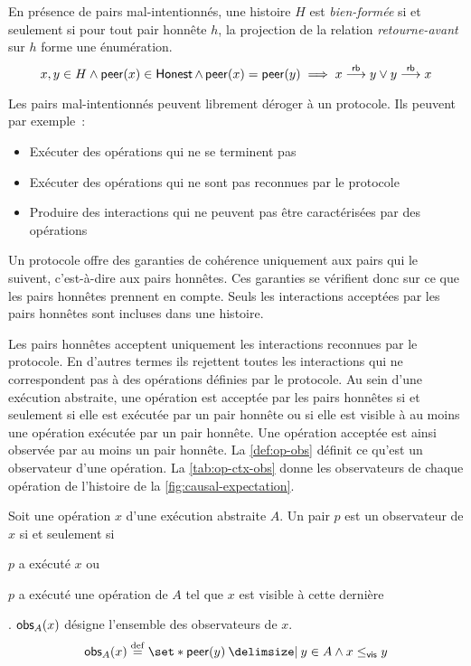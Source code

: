 \begin{definition}\label{def:wf-history-malicious}
En présence de pairs mal-intentionnés, une histoire $H$ est \emph{bien-formée} si et seulement si pour tout pair honnête $h$, la projection de la relation \emph{retourne-avant} sur $h$ forme une énumération.
\begin{equation*}
x, y \in H \land \operatorname{\mathsf{peer}}(x) \in \operatorname{\mathsf{Honest}} \land \operatorname{\mathsf{peer}}(x) = \operatorname{\mathsf{peer}}(y) \implies x \overset{\mathsf{rb}}{\longrightarrow} y \lor y \overset{\mathsf{rb}}{\longrightarrow} x
\end{equation*}
\end{definition}

Les pairs mal-intentionnés peuvent librement déroger à un protocole.
Ils peuvent par exemple~:
\begin{itemize}
    \item Exécuter des opérations qui ne se terminent pas
    \item Exécuter des opérations qui ne sont pas reconnues par le protocole
    \item Produire des interactions qui ne peuvent pas être caractérisées par des opérations
\end{itemize}
Un protocole offre des garanties de cohérence uniquement aux pairs qui le suivent, c'est-à-dire aux pairs honnêtes.
Ces garanties se vérifient donc sur ce que les pairs honnêtes prennent en compte.
Seuls les interactions acceptées par les pairs honnêtes sont incluses dans une histoire.

Les pairs honnêtes acceptent uniquement les interactions reconnues par le protocole.
En d'autres termes ils rejettent toutes les interactions qui ne correspondent pas à des opérations définies par le protocole.
Au sein d'une exécution abstraite, une opération est acceptée par les pairs honnêtes si et seulement si elle est exécutée par un pair honnête ou si elle est visible à au moins une opération exécutée par un pair honnête.
Une opération acceptée est ainsi observée par au moins un pair honnête.
La \autoref{def:op-obs} définit ce qu'est un observateur d'une opération.
La \autoref{tab:op-ctx-obs} donne les observateurs de chaque opération de l'histoire de la \autoref{fig:causal-expectation}.

\begin{definition}[Observateurs]\label{def:op-obs}
Soit une opération $x$ d'une exécution abstraite $A$.
Un pair $p$ est un observateur de $x$ si et seulement si \begin{inlinelist}\item $p$ a exécuté $x$ ou \item $p$ a exécuté une opération de $A$ tel que $x$ est visible à cette dernière\end{inlinelist}.
$\operatorname{\mathsf{obs}}_A(x)$ désigne l'ensemble des observateurs de $x$.
\begin{equation*}
  \trm{obs}_A(x) \defeq \set*{ \trm{peer}(y) \given y \in A \land x \viseq y}
\end{equation*}
\end{definition}

